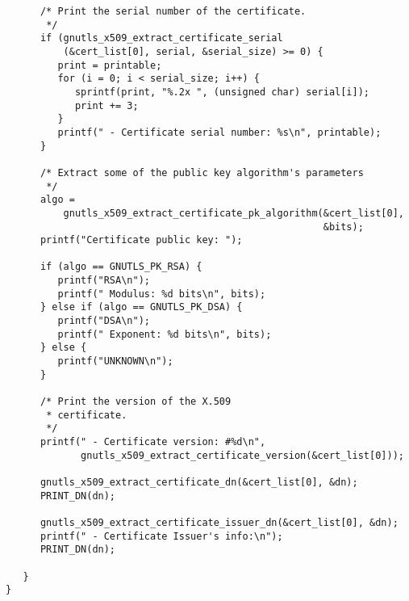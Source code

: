 \begin{verbatim}
      /* Print the serial number of the certificate.
       */
      if (gnutls_x509_extract_certificate_serial
          (&cert_list[0], serial, &serial_size) >= 0) {
         print = printable;
         for (i = 0; i < serial_size; i++) {
            sprintf(print, "%.2x ", (unsigned char) serial[i]);
            print += 3;
         }
         printf(" - Certificate serial number: %s\n", printable);
      }

      /* Extract some of the public key algorithm's parameters
       */
      algo =
          gnutls_x509_extract_certificate_pk_algorithm(&cert_list[0],
                                                       &bits);
      printf("Certificate public key: ");

      if (algo == GNUTLS_PK_RSA) {
         printf("RSA\n");
         printf(" Modulus: %d bits\n", bits);
      } else if (algo == GNUTLS_PK_DSA) {
         printf("DSA\n");
         printf(" Exponent: %d bits\n", bits);
      } else {
         printf("UNKNOWN\n");
      }

      /* Print the version of the X.509 
       * certificate.
       */
      printf(" - Certificate version: #%d\n",
             gnutls_x509_extract_certificate_version(&cert_list[0]));

      gnutls_x509_extract_certificate_dn(&cert_list[0], &dn);
      PRINT_DN(dn);

      gnutls_x509_extract_certificate_issuer_dn(&cert_list[0], &dn);
      printf(" - Certificate Issuer's info:\n");
      PRINT_DN(dn);

   }
}

\end{verbatim}
